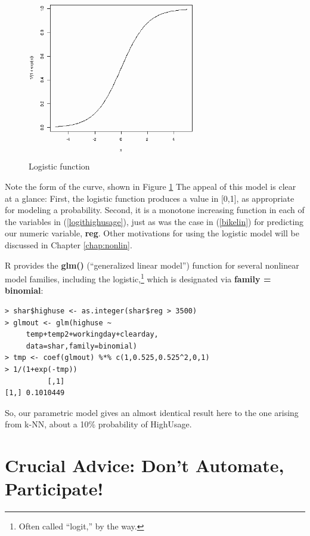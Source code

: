\begin{figure}
\centerline{
\includegraphics[width=3.05in]{Images/LogitCurve_gray.png}
}
\caption{Logistic function}
\label{logitcurve}
\end{figure}

Note the form of the curve, shown in Figure \ref{logitcurve}
The appeal of this model is clear at a glance:  First, the logistic function
produces a value in [0,1], as appropriate for modeling a probability.
Second, it is a monotone increasing function in each of the variables in
(\ref{logithighusage}), just as was the case in (\ref{bikelin}) for
predicting our numeric variable, {\bf reg}.  Other motivations for using
the logistic model will be discussed in Chapter \ref{chap:nonlin}.

R provides the {\bf glm()} (``generalized linear model'') function for
several nonlinear model families, including the logistic,\footnote{Often
called ``logit,'' by the way.} which is designated via {\bf family =
binomial}:

\begin{lstlisting}
> shar$highuse <- as.integer(shar$reg > 3500)
> glmout <- glm(highuse ~ 
     temp+temp2+workingday+clearday,
     data=shar,family=binomial)
> tmp <- coef(glmout) %*% c(1,0.525,0.525^2,0,1)
> 1/(1+exp(-tmp))
          [,1]
[1,] 0.1010449
\end{lstlisting}

So, our parametric model gives an almost identical result here to the
one arising from k-NN, about a 10\% probability of HighUsage.


\section{Crucial Advice: Don't Automate, Participate!}
\label{participate}

